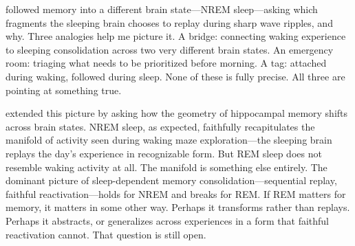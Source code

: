 \citet{yang2024selection} followed memory into a different brain state---NREM sleep---asking which
fragments the sleeping brain chooses to replay during sharp wave ripples, and why. Three analogies
help me picture it. A bridge: connecting waking experience to sleeping consolidation across two
very different brain states. An emergency room: triaging what needs to be prioritized before
morning. A tag: attached during waking, followed during sleep. None of these is fully precise.
All three are pointing at something true.

\citet{yang2023nreps} extended this picture by asking how the geometry of hippocampal memory
shifts across brain states. NREM sleep, as expected, faithfully recapitulates the manifold of
activity seen during waking maze exploration---the sleeping brain replays the day's experience
in recognizable form. But REM sleep does not resemble waking activity at all. The manifold is
something else entirely. The dominant picture of sleep-dependent memory consolidation---sequential
replay, faithful reactivation---holds for NREM and breaks for REM. If REM matters for memory,
it matters in some other way. Perhaps it transforms rather than replays. Perhaps it abstracts, or
generalizes across experiences in a form that faithful reactivation cannot. That question is still
open.


